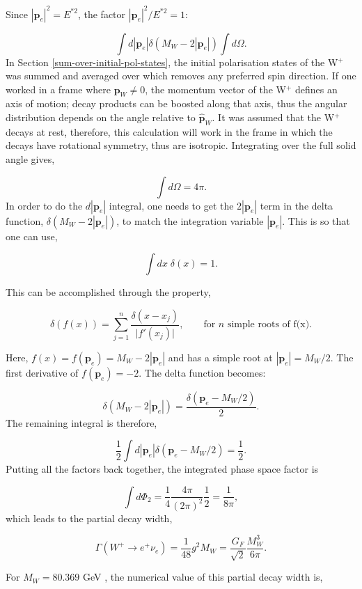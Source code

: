 \documentclass[a4paper,11pt]{article}
\begin{document}
Since $|\boldsymbol{p}_e|^2 = E^{*2}$, the factor $|\boldsymbol{p}_e|^2/E^{*2} =1$:

$$
\int  d|\boldsymbol{p}_e|\delta(M_W - 2|\boldsymbol{p}_e|) \int d\Omega.
$$
In Section \ref{sum-over-initial-pol-states}, the initial polarisation states of the W$^+$ was summed and averaged over which removes any preferred spin direction. If one worked in a frame where $\boldsymbol{p}_W \neq 0$, the momentum vector of the W$^+$ defines an axis of motion; decay products can be boosted along that axis, thus the angular distribution depends on the angle relative to $\boldsymbol{\hat{p}}_W$. It was assumed that the W$^+$ decays at rest, therefore, this calculation will work in the frame in which the decays have rotational symmetry, thus are isotropic. Integrating over the full solid angle gives,

$$
\int d\Omega = 4\pi.
$$
In order to do the $d|\boldsymbol{p}_e|$ integral, one needs to get the $2|\boldsymbol{p}_e|$ term in the delta function, $\delta(M_W - 2|\boldsymbol{p}_e|)$,  to match the integration variable $|\boldsymbol{p}_e|$. This is so that one can use,


$$
\int dx \; \delta(x) = 1.
$$

This can be accomplished through the property,

$$
	\delta(f(x))
=
\sum_{j=1}^{n}
\frac{\delta(x-x_j)}{\bigl| f'(x_j) \bigr|},
\qquad
\text{for $n$ simple roots of f(x)}.
$$
 
Here, $f(x) = f(\boldsymbol{p}_e) = M_W - 2|\boldsymbol{p}_e|$ and has a simple root at $|\boldsymbol{p}_e| = M_W/2.  $ The first derivative of $f(\boldsymbol{p}_e) = -2$. The delta function becomes:

$$
\delta(M_W -2|\boldsymbol{p}_e|) = \frac{\delta(\boldsymbol{p}_e - M_W/2)}{2}.
$$ 
The remaining integral is therefore,

$$
\frac{1}{2}\int  d|\boldsymbol{p}_e| \delta(\boldsymbol{p}_e - M_W/2) = \frac{1}{2}.
$$
Putting all the factors back together, the integrated phase space factor is

$$
\int d\Phi_{2} =  \frac{1}{4} \frac{4\pi}{(2\pi)^2} \frac{1}{2} = \frac{1}{8\pi},
$$
 which leads to the partial decay width,
 
 \begin{equation}
 	\Gamma(W^+ \rightarrow e^+ \nu_e)= \frac{1}{48}g^2M_W = \frac{G_F}{\sqrt{2}}\frac{M_W^3}{6\pi}.
 \end{equation}

For $M_W = 80.369$ GeV \cite{CMS:2024lrd}, the numerical value of this partial decay width is,
\end{document}
